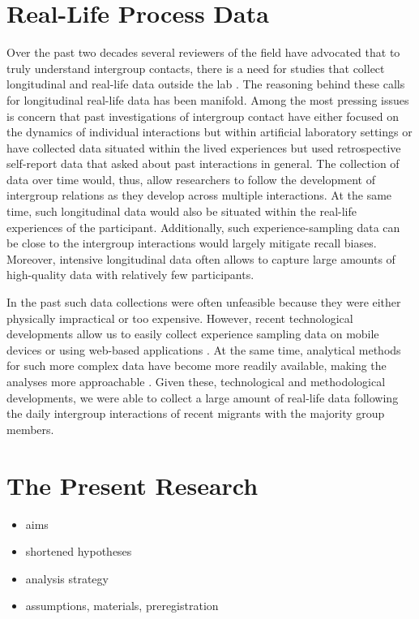 \documentclass[man, 12pt, a4paper]{apa7}
\theoremstyle{break}
\theoremstyle{plain}
\begin{document}
\section{Real-Life Process Data}
Over the past two decades several reviewers of the field have advocated that to truly understand intergroup contacts, there is a need for studies that collect longitudinal \citep[][]{Pettigrew1998, Pettigrew2008, Pettigrew2008b, Pettigrew2011} and real-life data outside the lab \citep[][]{MacInnis2015, McKeown2017}. The reasoning behind these calls for longitudinal real-life data has been manifold. Among the most pressing issues is concern that past investigations of intergroup contact have either focused on the dynamics of individual interactions but within artificial laboratory settings or have collected data situated within the lived experiences but used retrospective self-report data that asked about past interactions in general. The collection of data over time would, thus, allow researchers to follow the development of intergroup relations as they develop across multiple interactions. At the same time, such longitudinal data would also be situated within the real-life experiences of the participant. Additionally, such experience-sampling data can be close to the intergroup interactions would largely mitigate recall biases. Moreover, intensive longitudinal data often allows to capture large amounts of high-quality data with relatively few participants.

In the past such data collections were often unfeasible because they were either physically impractical or too expensive. However, recent technological developments allow us to easily collect experience sampling data on mobile devices \citep[e.g.,][]{Keil2020} or using web-based applications \citep[e.g.,][]{Arslan2020}. At the same time, analytical methods for such more complex data have become more readily available, making the analyses more approachable \citep[see, e.g.,][]{ODonnell2021}. Given these, technological and methodological developments, we were able to collect a large amount of real-life data following the daily intergroup interactions of recent migrants with the majority group members.  

\section{The Present Research}


\begin{itemize}
    \item aims
    \item shortened hypotheses
    \item analysis strategy
    \item assumptions, materials, preregistration
\end{itemize}
\end{document}
